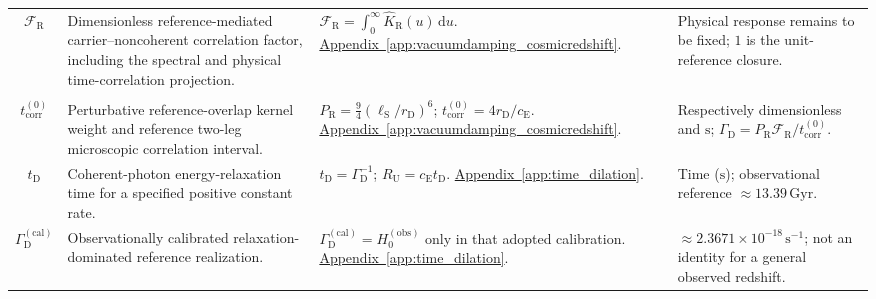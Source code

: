 \begin{longtable}{@{} c p{5.5cm} p{4cm} p{3.5cm} @{}}
$\mathcal F_{\mathrm R}$ & {\raggedright Dimensionless reference-mediated carrier--noncoherent correlation factor, including the spectral and physical time-correlation projection.\par} & {\raggedright $\mathcal F_{\mathrm R}=\int_0^\infty\widehat K_{\mathrm R}(u)\,\mathrm du$. \newline \hyperref[app:vacuumdamping_cosmicredshift]{Appendix~\ref*{app:vacuumdamping_cosmicredshift}}.\par} & {\raggedright Physical response remains to be fixed; $1$ is the unit-reference closure.\par} \\

\begin{tabular}[c]{@{}c@{}}$P_{\mathrm R}$ \\ $t_{\mathrm{corr}}^{(0)}$\end{tabular} & {\raggedright Perturbative reference-overlap kernel weight and reference two-leg microscopic correlation interval.\par} & {\raggedright $P_{\mathrm R}=\frac94(\ell_{\mathrm S}/r_{\mathrm D})^6$; $t_{\mathrm{corr}}^{(0)}=4r_{\mathrm D}/c_{\mathrm E}$. \newline \hyperref[app:vacuumdamping_cosmicredshift]{Appendix~\ref*{app:vacuumdamping_cosmicredshift}}.\par} & {\raggedright Respectively dimensionless and $\mathrm s$; $\Gamma_{\mathrm D}=P_{\mathrm R}\mathcal F_{\mathrm R}/t_{\mathrm{corr}}^{(0)}$.\par} \\

$t_{\mathrm D}$ & {\raggedright Coherent-photon energy-relaxation time for a specified positive constant rate.\par} & {\raggedright $t_{\mathrm D}=\Gamma_{\mathrm D}^{-1}$; $R_{\mathrm U}=c_{\mathrm E}t_{\mathrm D}$. \newline \hyperref[app:time_dilation]{Appendix~\ref*{app:time_dilation}}.\par} & {\raggedright Time ($\mathrm s$); observational reference $\approx13.39\,\mathrm{Gyr}$.\par} \\


$\Gamma_{\mathrm D}^{(\mathrm{cal})}$ & {\raggedright Observationally calibrated relaxation-dominated reference realization.\par} & {\raggedright $\Gamma_{\mathrm D}^{(\mathrm{cal})}=H_0^{(\mathrm{obs})}$ only in that adopted calibration. \newline \hyperref[app:time_dilation]{Appendix~\ref*{app:time_dilation}}.\par} & {\raggedright $\approx2.3671\times10^{-18}\,\mathrm{s^{-1}}$; not an identity for a general observed redshift.\par} \\


\end{longtable}
